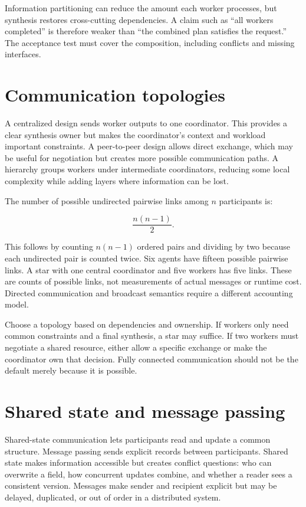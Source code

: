 Information partitioning can reduce the amount each worker processes, but synthesis restores cross-cutting dependencies. A claim such as “all workers completed” is therefore weaker than “the combined plan satisfies the request.” The acceptance test must cover the composition, including conflicts and missing interfaces.

\section{Communication topologies}
A centralized design sends worker outputs to one coordinator. This provides a clear synthesis owner but makes the coordinator's context and workload important constraints. A peer-to-peer design allows direct exchange, which may be useful for negotiation but creates more possible communication paths. A hierarchy groups workers under intermediate coordinators, reducing some local complexity while adding layers where information can be lost.

The number of possible undirected pairwise links among \(n\) participants is:

\begin{equation}
\frac{n(n-1)}{2}.
\end{equation}

This follows by counting \(n(n-1)\) ordered pairs and dividing by two because each undirected pair is counted twice. Six agents have fifteen possible pairwise links. A star with one central coordinator and five workers has five links. These are counts of possible links, not measurements of actual messages or runtime cost. Directed communication and broadcast semantics require a different accounting model.

Choose a topology based on dependencies and ownership. If workers only need common constraints and a final synthesis, a star may suffice. If two workers must negotiate a shared resource, either allow a specific exchange or make the coordinator own that decision. Fully connected communication should not be the default merely because it is possible.

\section{Shared state and message passing}
Shared-state communication lets participants read and update a common structure. Message passing sends explicit records between participants. Shared state makes information accessible but creates conflict questions: who can overwrite a field, how concurrent updates combine, and whether a reader sees a consistent version. Messages make sender and recipient explicit but may be delayed, duplicated, or out of order in a distributed system.

